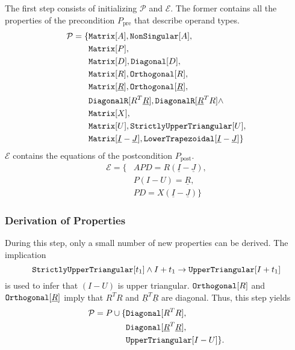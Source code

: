 The first step consists of initializing $\mathcal{P}$ and $\mathcal{E}$. The former contains all the properties of the precondition $P_\text{pre}$ that describe operand types.
%
\begin{align*}
\mathcal{P} = \{ & \text{\ttfamily Matrix}[A], \text{\ttfamily NonSingular}[A], \\
		& \text{\ttfamily Matrix}[P], \\
		& \text{\ttfamily Matrix}[D], \text{\ttfamily Diagonal}[D], \\
		& \text{\ttfamily Matrix}[R],  \text{\ttfamily Orthogonal}[R], \\
		& \text{\ttfamily Matrix}[\underline{R}], \text{\ttfamily Orthogonal}[\underline{R}], \\
		&\text{\ttfamily DiagonalR}[R^T \underline{R}], \text{\ttfamily DiagonalR}[\underline{R}^T R] \land \\
		& \text{\ttfamily Matrix}[X], \\
		& \text{\ttfamily Matrix}[U], \text{\ttfamily StrictlyUpperTriangular}[U], \\
		& \text{\ttfamily Matrix}[\underline{I} - \underline{J}], \text{\ttfamily LowerTrapezoidal}[\underline{I} - \underline{J}] \} \\
\end{align*}
%
$\mathcal{E}$ contains the equations of the postcondition $P_\text{post}$.
%
\begin{align*}
\mathcal{E} = \{ &APD = R \left( \underline{I} - \underline{J}  \right), \\
	&P \left( I - U \right) = \underline{R}, \\
	&PD = X \left( \underline{I} - \underline{J} \right) \}
\end{align*}
%
\subsubsection{Derivation of Properties}
%
During this step, only a small number of new properties can be derived. The implication
%
$$\text{\ttfamily StrictlyUpperTriangular}[t_1] \land I + t_1 \rightarrow \text{\ttfamily UpperTriangular}[I + t_1]$$
%
is used to infer that $(I - U)$ is upper triangular. $\text{\ttfamily Orthogonal}[R]$ and $\text{\ttfamily Orthogonal}[\underline{R}]$ imply that $R^T R$ and $\underline{R}^T \underline{R}$ are diagonal. Thus, this step yields
%
\begin{align*}
\mathcal{P} = P \cup \{ &\text{\ttfamily Diagonal}[R^T R], \\
				&\text{\ttfamily Diagonal}[\underline{R}^T \underline{R}], \\
				& \text{\ttfamily UpperTriangular}[I - U] \}\text{.}
\end{align*}
%

